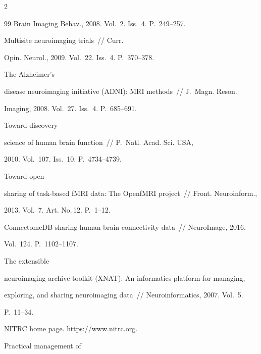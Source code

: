 \begin{multicols}{2}
{{\begin{thebibliography}{99}
Brain Imaging Behav., 2008. Vol.~2. Iss.~4. P.~249--257.




   Multisite neuroimaging trials~// Curr. 


Opin. Neurol., 2009. Vol.~22. Iss.~4. P.~370--378. 




   The Alzheimer's 


disease neuroimaging initiative (ADNI): MRI methods~// J.~Magn. Reson. 


Imaging, 2008. Vol.~27. Iss.~4. P.~685--691.




   Toward discovery 


science of human brain function~// P.~Natl. Acad. Sci. USA, 


2010. Vol.~107. Iss.~10. P.~4734--4739.




   Toward open 


sharing of task-based fMRI data: The OpenfMRI project~// Front. Neuroinform., 


2013. Vol.~7. Art. No.\,12. P.~1--12.






ConnectomeDB-sharing human brain connectivity data~// NeuroImage, 2016. 


Vol.~124. P.~1102--1107.




   The extensible 


neuroimaging archive toolkit (XNAT): An informatics platform for managing, 


exploring, and sharing neuroimaging data~// Neuroinformatics, 2007. Vol.~5. 


P.~11--34.




  NITRC home page. {\sf https://www.nitrc.org}.




   Practical management of 



\end{thebibliography}}}
\end{multicols}
